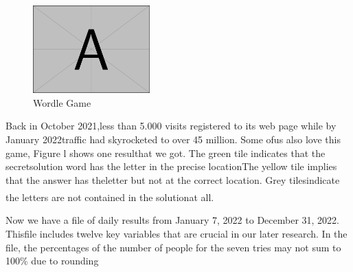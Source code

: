\documentclass[12pt]{ctexart}
\newcommand{\upcite}[1]{\textsuperscript{\textsuperscript{\cite{#1}}}}%
\begin{document}
\begin{figure}
	\vspace{-15pt}
	\includegraphics*[width=0.4\textwidth]{example-image-a.pdf}
	\vspace{0pt}
	\caption{Wordle Game}
	\vspace{-20pt}
\end{figure}
Back in October 2021,less than 5.000 visits registered to its web page while by January 2022traffic had skyrocketed to over 45 million. Some ofus also love this game, Figure l shows one resulthat we got. The green tile indicates that the secretsolution word has the letter in the precise locationThe yellow tile implies that the answer has theletter but not at the correct location. Grey tilesindicate the letters are not contained in the solutionat all\upcite{3}.


Now we have a file of daily results from January 7, 2022 to December 31, 2022. Thisfile includes twelve key variables that are crucial in our later research. In the file, the percentages of the number of people for the seven tries may not sum to 100\% due to rounding
\end{document}
